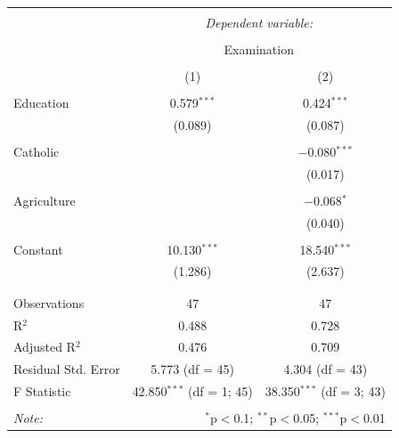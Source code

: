 \documentclass[
  12pt,
]{style/krantz}
\begin{document}
\begin{table}[H] \centering 
  \caption{} 
  \label{} 
\begin{tabular}{@{\extracolsep{5pt}}lcc} 
\\[-1.8ex]\hline 
\hline \\[-1.8ex] 
 & \multicolumn{2}{c}{\textit{Dependent variable:}} \\ 
\cline{2-3} 
\\[-1.8ex] & \multicolumn{2}{c}{Examination} \\ 
\\[-1.8ex] & (1) & (2)\\ 
\hline \\[-1.8ex] 
 Education & 0.579$^{***}$ & 0.424$^{***}$ \\ 
  & (0.089) & (0.087) \\ 
  & & \\ 
 Catholic &  & $-$0.080$^{***}$ \\ 
  &  & (0.017) \\ 
  & & \\ 
 Agriculture &  & $-$0.068$^{*}$ \\ 
  &  & (0.040) \\ 
  & & \\ 
 Constant & 10.130$^{***}$ & 18.540$^{***}$ \\ 
  & (1.286) & (2.637) \\ 
  & & \\ 
\hline \\[-1.8ex] 
Observations & 47 & 47 \\ 
R$^{2}$ & 0.488 & 0.728 \\ 
Adjusted R$^{2}$ & 0.476 & 0.709 \\ 
Residual Std. Error & 5.773 (df = 45) & 4.304 (df = 43) \\ 
F Statistic & 42.850$^{***}$ (df = 1; 45) & 38.350$^{***}$ (df = 3; 43) \\ 
\hline 
\hline \\[-1.8ex] 
\textit{Note:}  & \multicolumn{2}{r}{$^{*}$p$<$0.1; $^{**}$p$<$0.05; $^{***}$p$<$0.01} \\ 
\end{tabular} 
\end{table}

  

\backmatter
\printindex
\end{document}
